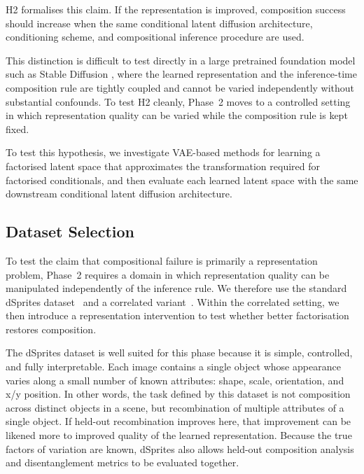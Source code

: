 H2 formalises this claim.
If the representation is improved, composition success should increase when the same conditional
latent diffusion architecture, conditioning scheme, and compositional inference procedure are used.

This distinction is difficult to test directly in a large pretrained foundation model such as Stable Diffusion \citep{rombach2022high}, where the learned representation and the inference-time composition rule are tightly coupled and cannot be varied independently without substantial confounds.
To test H2 cleanly, Phase~2 moves to a controlled setting in which representation quality can be
varied while the composition rule is kept fixed.

To test this hypothesis, we investigate VAE-based methods for learning a factorised latent space that
approximates the transformation required for factorised conditionals, and then evaluate each learned
latent space with the same downstream conditional latent diffusion architecture.


\subsection{Dataset Selection}
\label{subsec:p2_testbeds}

To test the claim that compositional failure is primarily a representation problem, Phase~2
requires a domain in which representation quality can be manipulated independently of the
inference rule. We therefore use the standard dSprites dataset~\citep{dsprites17} and a
correlated variant~\citep{roth2023disentanglement}. Within the correlated setting, we then
introduce a representation intervention to test whether better factorisation restores
composition.

The dSprites dataset is well suited for this phase because it is simple, controlled, and
fully interpretable. Each image contains a single object whose appearance varies along a
small number of known attributes: shape, scale, orientation, and x/y position. 
In other words, the task defined by this dataset is not composition across distinct objects in a scene, but recombination of multiple attributes of a single object.
If held-out recombination improves here, that improvement can be likened more to improved quality of the learned representation.
Because the true factors of variation are known, dSprites also allows
held-out composition analysis and disentanglement metrics \citep{disentengaled_representation_learning, on_disentangled_representation_learning} to be evaluated together.

